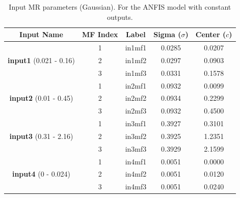\documentclass[12pt]{article}
\begin{document}
\begin{table}[H]
\centering
\begin{tabular}{|c|c|c|c|c|}
\hline
\textbf{Input Name} & \textbf{MF Index} & \textbf{Label} & \textbf{Sigma ($\sigma$)} & \textbf{Center ($c$)} \\ \hline
\multirow{3}{*}{\textbf{input1} (0.021 - 0.16)} 
 & 1 & in1mf1 & 0.0285 & 0.0207 \\ \cline{2-5} 
 & 2 & in1mf2 & 0.0297 & 0.0903 \\ \cline{2-5} 
 & 3 & in1mf3 & 0.0331 & 0.1578 \\ \hline
\hline
\multirow{3}{*}{\textbf{input2} (0.01 - 0.45)} 
 & 1 & in2mf1 & 0.0932 & 0.0099 \\ \cline{2-5} 
 & 2 & in2mf2 & 0.0934 & 0.2299 \\ \cline{2-5} 
 & 3 & in2mf3 & 0.0932 & 0.4500 \\ \hline
\hline
\multirow{3}{*}{\textbf{input3} (0.31 - 2.16)} 
 & 1 & in3mf1 & 0.3927 & 0.3101 \\ \cline{2-5} 
 & 2 & in3mf2 & 0.3925 & 1.2351 \\ \cline{2-5} 
 & 3 & in3mf3 & 0.3929 & 2.1599 \\ \hline
\hline
\multirow{3}{*}{\textbf{input4} (0 - 0.024)} 
 & 1 & in4mf1 & 0.0051 & 0.0000 \\ \cline{2-5} 
 & 2 & in4mf2 & 0.0051 & 0.0120 \\ \cline{2-5} 
 & 3 & in4mf3 & 0.0051 & 0.0240 \\ \hline
\end{tabular}
\label{tab:inputconstantBa}
\caption{Input MR parameters (Gaussian). 
For the ANFIS model with constant outputs.}
\end{table}
\end{document}
